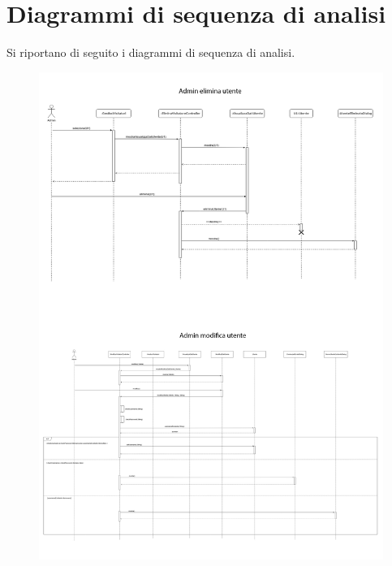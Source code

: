 \section{Diagrammi di sequenza di analisi}
Si riportano di seguito i diagrammi di sequenza di analisi.
\begin{figure}[h!]
    \includegraphics[width=\textwidth]{SequenceAnalisi/1.png}
\end{figure}
